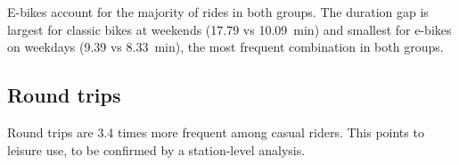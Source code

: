 \Mes{} E-bikes account for the majority of rides in both groups. The duration gap is largest for classic bikes at weekends (17.79 vs 10.09~min) and smallest for e-bikes on weekdays (9.39 vs 8.33~min), the most frequent combination in both groups.

\subsection{Round trips}

\begin{table}[!htb]
\caption{Rides ending at their start station}
\label{tab:roundtrips}
\small

\par{}
\end{table}

\Mes{} Round trips are 3.4 times more frequent among casual riders. \Int{} This points to leisure use, to be confirmed by a station-level analysis.
